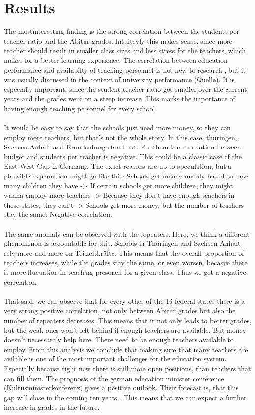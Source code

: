 \section*{Results}
The mostinteresting finding is the strong correlation between the students per teacher ratio and the Abitur grades. Intuitevly this makes sense, since more teacher should result in smaller class sizes and less stress for the teachers, which makes for a better learning experience. The correlation between education performance and availabilty of teaching personnel is not new to research \cite{doi:10.1080/00220485.1984.10845072}, but it was usually discussed in the context of university performance (Quelle). It is especially important, since the student teacher ratio got smaller over the current years and the grades went on a steep increase. This marks the importance of having enough teaching personnel for every school.\\\\
It would be easy to say that the schools just need more money, so they can employ more teachers, but that's not the whole story. In this case, thüringen, Sachsen-Anhalt and Brandenburg stand out. For them the correlation between budget and students per teacher is negative. This could be a classic case of the East-West-Gap in Germany. The exact reasons are up to speculation, but a plausible explanation might go like this: Schools get money mainly based on how many children they have -> If certain schools get more children, they might wanna employ more teachers -> Because they don't have enough teachers in these states, they can't -> Schools get more money, but the number of teachers stay the same: Negative correlation.\\\\
The same anomaly can be observed with the repeaters. Here, we think a different phenomenon is accountable for this. Schools in Thüringen and Sachsen-Anhalt rely more and more on Teilzeitkräfte. This means that the overall proportion of teachers increases, while the grades stay the same, or even worsen, becasue there is more flucuation in teaching presonell for a given class. Thus we get a negative correlation.\\\\
That said, we can observe that for every other of the 16 federal states there is a very strong positive correlation, not only between Abitur grades but also the number of repeaters decreases. This means that it not only leads to better grades, but the weak ones won't left behind if enough teachers are available. But money doesn't necessaraly help here. There need to be enough teachers available to employ. From this analysis we conclude that making sure that many teachers are avilable is one of the most important challenges for the education system. Especially because right now there is still more open positions, than teachers that can fill them. The prognosis of the german education minister conference (Kultusministerkonferenz) gives a positive outlook. Their forecast is, that this gap will close in the coming ten years \cite{Kultusministerkonferenz}. This means that we can expect a further increase in grades in the future.\\\\

